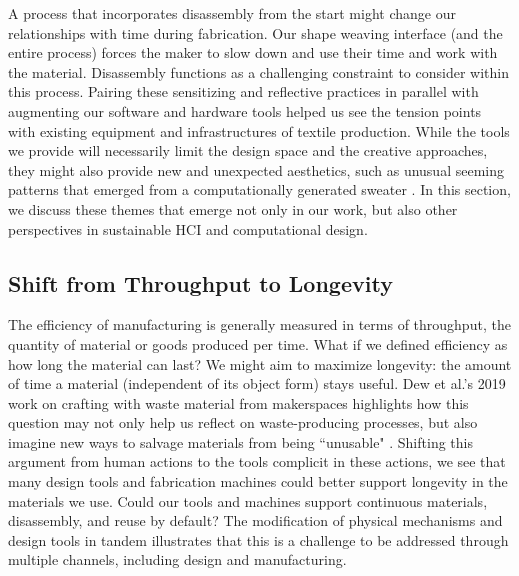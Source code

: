 A process that incorporates disassembly from the start might change our relationships with time during fabrication. Our shape weaving interface (and the entire process) forces the maker to slow down and use their time and work with the material. Disassembly functions as a challenging constraint to consider within this process. %
Pairing these sensitizing and reflective practices in parallel with augmenting our software and hardware tools helped us see the tension points with existing equipment and infrastructures of textile production. %
While the tools we provide will necessarily limit the design space and the creative approaches, they might also provide new and unexpected aesthetics, such as unusual seeming patterns that emerged from a computationally generated sweater \cite{beta_brand_brown}. In this section, we discuss these themes that emerge not only in our work, but also other perspectives in sustainable HCI and computational design.


\subsection{Shift from Throughput to Longevity}

The efficiency of manufacturing is generally measured in terms of throughput, the quantity of material or goods produced per time. What if we defined efficiency as how long the material can last? We might aim to maximize longevity: the amount of time a material (independent of its object form) stays useful. Dew et al.'s 2019 work on crafting with waste material from makerspaces highlights how this question may not only help us reflect on waste-producing processes, but also imagine new ways to salvage materials from being ``unusable" \cite{Dew:2019:DWS:3322276.3322320}. Shifting this argument from human actions to the tools complicit in these actions, we see that many design tools and fabrication machines could better support longevity in the materials we use. Could our tools and machines support continuous materials, disassembly, and reuse by default? The modification of physical mechanisms and design tools in tandem illustrates that this is a challenge to be addressed through multiple channels, including design and manufacturing. 

